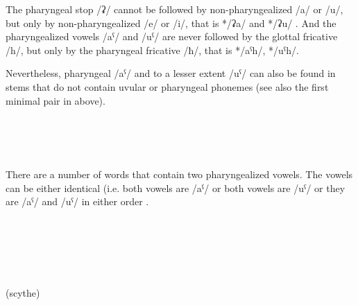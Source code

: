 The pharyngeal stop /ʡ/ cannot be followed by non-pharyngealized /a/ or /u/, but only by non-pharyngealized /e/ or /i/, that is */ʡa/ and */ʡu/ . And the pharyngealized vowels /aˁ/ and /uˁ/ are never followed by the glottal fricative /h/, but only by the pharyngeal fricative /ħ/, that is */aˁh/, */uˁh/.

Nevertheless, pharyngeal /aˁ/ and to a lesser extent /uˁ/ can also be found in stems that do not contain uvular or pharyngeal phonemes  (see also the first minimal pair in  above).
%
\begin{exe}
	\ex	\label{ex:not uvular phon}
\TabPositions{12em}
		 	\tab 		{} 	\\
		 	\tab 		{} 	\\
		 	\tab 		{} 	\\
		 	\tab 		{} 	

\end{exe}

There are a number of words that contain two pharyngealized vowels. The vowels can be either identical (i.e. both vowels are /aˁ/ or both vowels are /uˁ/ or they are /aˁ/ and /uˁ/ in either order .
%
\begin{exe}
	\ex	\label{ex:two pharyngealized vowels phon}
\TabPositions{18em}
		 	\tab 	{} 	\\
		 		\tab 	{} 	\\
		 		\tab 	{} 			\\
		 		\tab 	{} 	\\
		  	\tab {} 	 \\
		(scythe) 
\end{exe}


